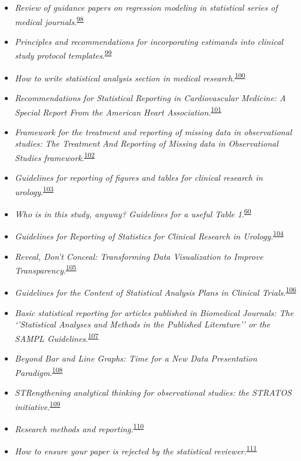 \documentclass[
]{book}
\begin{document}
\begin{itemize}
\item
  \emph{Review of guidance papers on regression modeling in statistical series of medical journals}.\textsuperscript{\protect\hyperlink{ref-Wallisch2022}{98}}
\item
  \emph{Principles and recommendations for incorporating estimands into clinical study protocol templates}.\textsuperscript{\protect\hyperlink{ref-Lynggaard2022}{99}}
\item
  \emph{How to write statistical analysis section in medical research}.\textsuperscript{\protect\hyperlink{ref-Dwivedi2022}{100}}
\item
  \emph{Recommendations for Statistical Reporting in Cardiovascular Medicine: A Special Report From the American Heart Association}.\textsuperscript{\protect\hyperlink{ref-Althouse2021}{101}}
\item
  \emph{Framework for the treatment and reporting of missing data in observational studies: The Treatment And Reporting of Missing data in Observational Studies framework}.\textsuperscript{\protect\hyperlink{ref-Lee2021}{102}}
\item
  \emph{Guidelines for reporting of figures and tables for clinical research in urology}.\textsuperscript{\protect\hyperlink{ref-Vickers2020}{103}}
\item
  \emph{Who is in this study, anyway? Guidelines for a useful Table 1}.\textsuperscript{\protect\hyperlink{ref-Hayes-Larson2019}{60}}
\item
  \emph{Guidelines for Reporting of Statistics for Clinical Research in Urology}.\textsuperscript{\protect\hyperlink{ref-assel2019}{104}}
\item
  \emph{Reveal, Don't Conceal: Transforming Data Visualization to Improve Transparency}.\textsuperscript{\protect\hyperlink{ref-Weissgerber2019}{105}}
\item
  \emph{Guidelines for the Content of Statistical Analysis Plans in Clinical Trials}.\textsuperscript{\protect\hyperlink{ref-Gamble2017}{106}}
\item
  \emph{Basic statistical reporting for articles published in Biomedical Journals: The `'Statistical Analyses and Methods in the Published Literature'' or the SAMPL Guidelines}.\textsuperscript{\protect\hyperlink{ref-Lang2015}{107}}
\item
  \emph{Beyond Bar and Line Graphs: Time for a New Data Presentation Paradigm}.\textsuperscript{\protect\hyperlink{ref-Weissgerber2015}{108}}
\item
  \emph{STRengthening analytical thinking for observational studies: the STRATOS initiative}.\textsuperscript{\protect\hyperlink{ref-Sauerbrei2014}{109}}
\item
  \emph{Research methods and reporting}.\textsuperscript{\protect\hyperlink{ref-groves2008}{110}}
\item
  \emph{How to ensure your paper is rejected by the statistical reviewer}.\textsuperscript{\protect\hyperlink{ref-stratton2005}{111}}
\end{itemize}
\end{document}
